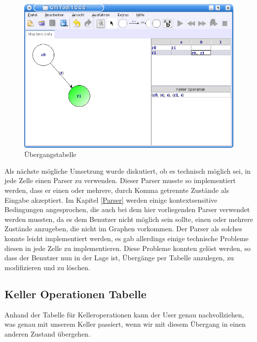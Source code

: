 \begin{figure}[h!]
\begin{center}
\includegraphics[width=12cm]{../images/machine_table.png}
\caption{Übergangstabelle}
\end{center}
\end{figure}

Als nächste mögliche Umsetzung wurde diskutiert, ob es technisch möglich sei,
in jede Zelle einen Parser zu verwenden. Dieser Parser musste so implementiert
werden, dass er einen oder mehrere, durch Komma getrennte Zustände als Eingabe
akzeptiert. Im Kapitel \ref{Parser} werden einige kontextsensitive Bedingungen
angesprochen, die auch bei dem hier vorliegenden Parser verwendet werden
mussten, da es dem Benutzer nicht möglich sein sollte, einen oder mehrere
Zustände anzugeben, die nicht im Graphen vorkommen. Der Parser als solches
konnte leicht implementiert werden, es gab allerdings einige technische
Probleme diesen in jede Zelle zu implementieren. Diese Probleme konnten gelöst
werden, so dass der Benutzer nun in der Lage ist, Übergänge per Tabelle
anzulegen, zu modifizieren und zu löschen.


\subsection{Keller Operationen Tabelle}

Anhand der Tabelle für Kelleroperationen kann der User genau nachvollziehen,
was genau mit unserem Keller passiert, wenn wir mit diesem
Übergang in einen anderen Zustand übergehen.

